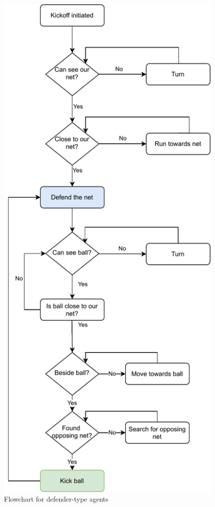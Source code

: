 \documentclass[conference]{IEEEtran}
\begin{document}
	\begin{figure}[ht]
		\centering
		\includegraphics[scale=0.5]{fig/defender-flowchart.pdf}
		\caption{Flowchart for defender-type agents}
		\label{flowchart-defender}
	\end{figure}
	
\end{document}
